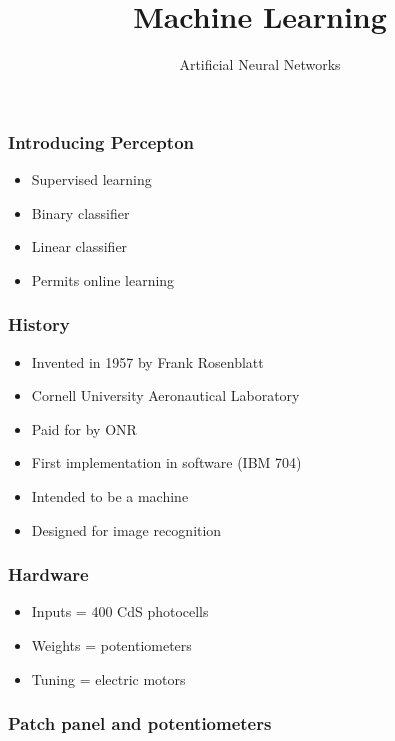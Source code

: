 
\title
{Machine Learning}
\subtitle{Artificial Neural Networks}




\maketitle

\begin{frame}
\end{frame}

\begin{frame}
  \frametitle{Introducing Percepton}
  \begin{itemize}
  \item Supervised learning
  \item Binary classifier
  \item Linear classifier
  \item Permits online learning
  \end{itemize}
\end{frame}

\begin{frame}
  \frametitle{History}
  \begin{itemize}
  \item Invented in 1957 by Frank Rosenblatt
  \item Cornell University Aeronautical Laboratory
  \item Paid for by ONR
  \item First implementation in software (IBM 704)
  \item Intended to be a machine
  \item Designed for image recognition
  \end{itemize}
\end{frame}

\begin{frame}
  \frametitle{Hardware}
  \begin{itemize}
  \item Inputs = 400 CdS photocells
  \item Weights = potentiometers
  \item Tuning = electric motors
  \end{itemize}
\end{frame}

\begin{frame}
  \frametitle{Patch panel and potentiometers}
\end{frame}

